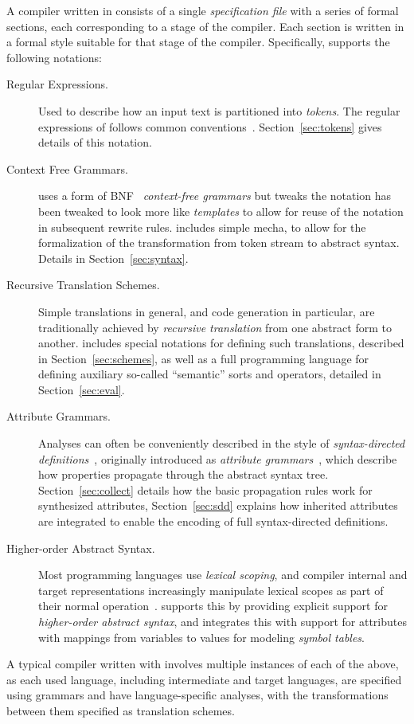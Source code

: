 \documentclass[11pt]{article} %
\begin{document}
A compiler written in \HAX consists of a single \emph{specification file} with a series of formal
sections, each corresponding to a stage of the compiler.  Each section is written in a formal style
suitable for that stage of the compiler. Specifically, \HAX supports the following notations:
\begin{description}

\item[Regular Expressions.] Used to describe how an input text is partitioned into
  \emph{tokens}. The regular expressions of \HAX follows common
  conventions~\cite{Aho+:2006}. Section~\ref{sec:tokens} gives details of this notation.

\item[Context Free Grammars.] \HAX uses a form of BNF~\cite{NaurEtal:cacm1960} \emph{context-free
    grammars} but tweaks the notation has been tweaked to look more like \emph{templates} to allow
  for reuse of the notation in subsequent rewrite rules. \HAX includes simple mecha, to allow for
  the formalization of the transformation from token stream to abstract syntax. Details in
  Section~\ref{sec:syntax}.

\item[Recursive Translation Schemes.] Simple translations in general, and code generation in
  particular, are traditionally achieved by \emph{recursive translation} from one abstract form to
  another.  \HAX includes special notations for defining such translations, described in
  Section~\ref{sec:schemes}, as well as a full programming language for defining auxiliary so-called
  ``semantic'' sorts and operators, detailed in Section~\ref{sec:eval}.

\item[Attribute Grammars.] Analyses can often be conveniently described in the style of
  \emph{syntax-directed definitions}~\cite{Aho+:2006}, originally introduced as \emph{attribute
    grammars}~\cite{Knuth:mst1968}, which describe how properties propagate through the abstract
  syntax tree.  Section~\ref{sec:collect} details how the basic propagation rules work for
  synthesized attributes, Section~\ref{sec:sdd} explains how inherited attributes are integrated to
  enable the encoding of full syntax-directed definitions.

\item[Higher-order Abstract Syntax.] Most programming languages use \emph{lexical scoping}, and
  compiler internal and target representations increasingly manipulate lexical scopes as part of
  their normal operation~\cite{MarlowPeyton-Jones:2010,Morrisett+:popl1998}. \HAX supports this by
  providing explicit support for \emph{higher-order abstract syntax}, and integrates this with
  support for attributes with mappings from variables to values for modeling \emph{symbol tables}.

\end{description}
A typical compiler written with \HAX involves multiple instances of each of the above, as each used
language, including intermediate and target languages, are specified using grammars and have
language-specific analyses, with the transformations between them specified as translation schemes.
\end{document}
